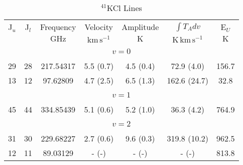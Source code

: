 \begin{table*}[htp]
\centering
\caption{$^{41}$KCl Lines}
\begin{tabular}{ccccccc}
\label{tab:41KCl_salt_lines}
 J$_u$ & J$_l$ & Frequency & Velocity & Amplitude & $\int T_A dv$ & E$_U$ \\
  &  & $\mathrm{GHz}$ & $\mathrm{km\,s^{-1}}$ & $\mathrm{K}$ & $\mathrm{K\,km\,s^{-1}}$ & $\mathrm{K}$ \\
\hline
&\vspace{-0.75em}\\
\multicolumn{7}{c}{$v = 0$} \\
\vspace{-0.75em}\\
 29 & 28 & 217.54317 & 5.5 (0.7) & 4.5 (0.4) & 72.9 (4.0) & 156.7 \\
 13 & 12 & 97.62809 & 4.7 (2.5) & 6.5 (1.3) & 162.6 (24.7) & 32.8 \\
&\vspace{-0.75em}\\
\multicolumn{7}{c}{$v = 1$} \\
\vspace{-0.75em}\\
 45 & 44 & 334.85439 & 5.1 (0.6) & 5.2 (1.0) & 36.3 (4.2) & 764.9 \\
&\vspace{-0.75em}\\
\multicolumn{7}{c}{$v = 2$} \\
\vspace{-0.75em}\\
 31 & 30 & 229.68227 & 2.7 (0.6) & 9.6 (0.3) & 319.8 (10.2) & 962.5 \\
 12 & 11 & 89.03129 & - (-) & - (-) & - (-) & 813.8 \\
\hline
\end{tabular}

\par 
\end{table*}
